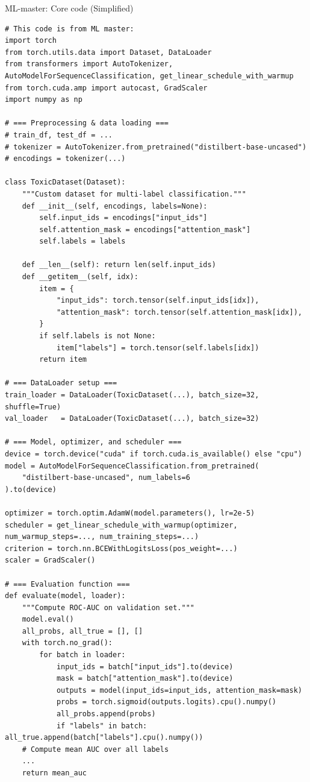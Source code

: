 \begin{codebox}{ML-master: Core code (Simplified)}
\label{lst:mlmaster_core}
\begin{verbatim}
# This code is from ML master: 
import torch
from torch.utils.data import Dataset, DataLoader
from transformers import AutoTokenizer, AutoModelForSequenceClassification, get_linear_schedule_with_warmup
from torch.cuda.amp import autocast, GradScaler
import numpy as np

# === Preprocessing & data loading ===
# train_df, test_df = ...
# tokenizer = AutoTokenizer.from_pretrained("distilbert-base-uncased")
# encodings = tokenizer(...)

class ToxicDataset(Dataset):
    """Custom dataset for multi-label classification."""
    def __init__(self, encodings, labels=None):
        self.input_ids = encodings["input_ids"]
        self.attention_mask = encodings["attention_mask"]
        self.labels = labels

    def __len__(self): return len(self.input_ids)
    def __getitem__(self, idx):
        item = {
            "input_ids": torch.tensor(self.input_ids[idx]),
            "attention_mask": torch.tensor(self.attention_mask[idx]),
        }
        if self.labels is not None:
            item["labels"] = torch.tensor(self.labels[idx])
        return item

# === DataLoader setup ===
train_loader = DataLoader(ToxicDataset(...), batch_size=32, shuffle=True)
val_loader   = DataLoader(ToxicDataset(...), batch_size=32)

# === Model, optimizer, and scheduler ===
device = torch.device("cuda" if torch.cuda.is_available() else "cpu")
model = AutoModelForSequenceClassification.from_pretrained(
    "distilbert-base-uncased", num_labels=6
).to(device)

optimizer = torch.optim.AdamW(model.parameters(), lr=2e-5)
scheduler = get_linear_schedule_with_warmup(optimizer, num_warmup_steps=..., num_training_steps=...)
criterion = torch.nn.BCEWithLogitsLoss(pos_weight=...)
scaler = GradScaler()

# === Evaluation function ===
def evaluate(model, loader):
    """Compute ROC-AUC on validation set."""
    model.eval()
    all_probs, all_true = [], []
    with torch.no_grad():
        for batch in loader:
            input_ids = batch["input_ids"].to(device)
            mask = batch["attention_mask"].to(device)
            outputs = model(input_ids=input_ids, attention_mask=mask)
            probs = torch.sigmoid(outputs.logits).cpu().numpy()
            all_probs.append(probs)
            if "labels" in batch: all_true.append(batch["labels"].cpu().numpy())
    # Compute mean AUC over all labels
    ...
    return mean_auc


\end{verbatim}
\end{codebox}
